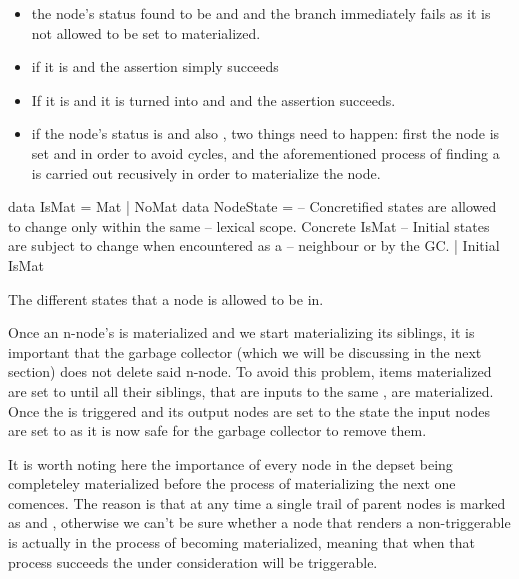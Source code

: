\begin{itemize}
\item the node's status found to be  and  and the branch
immediately fails as it is not allowed to be set to materialized.
\item if it is  and  the assertion simply succeeds
\item If it is  and  it is turned into  and 
and the assertion succeeds.
\item if the node's status is  and also , two things need
to happen: first the node is set  and  in order to
avoid cycles, and the aforementioned process of finding a 
is carried out recusively in order to materialize the node.
\end{itemize}

\begin{code}
\begin{haskellcode}
data IsMat = Mat | NoMat
data NodeState =
  -- Concretified states are allowed to change only within the same
  -- lexical scope.
  Concrete IsMat
  -- Initial states are subject to change when encountered as a
  -- neighbour or by the GC.
  | Initial IsMat
\end{haskellcode}
\caption{\label{orge1e857d}The different states that a node is allowed to be in.}
\end{code}


Once an n-node's is materialized and we start materializing its
siblings, it is important that the garbage collector (which we will be
discussing in the next section) does not delete said n-node.  To avoid
this problem, items materialized are set to  until all
their siblings, that are inputs to the same , are
materialized. Once the  is triggered and its output nodes are
set to the  state the input nodes are set to  as it is now safe for the garbage collector to remove them.

It is worth noting here the importance of every node in the depset
being completeley materialized before the process of materializing the
next one comences. The reason is that at any time a single trail of
parent nodes is marked as  and , otherwise we can't
be sure whether a  node that renders a 
non-triggerable is actually in the process of becoming materialized,
meaning that when that process succeeds the  under
consideration will be triggerable.
